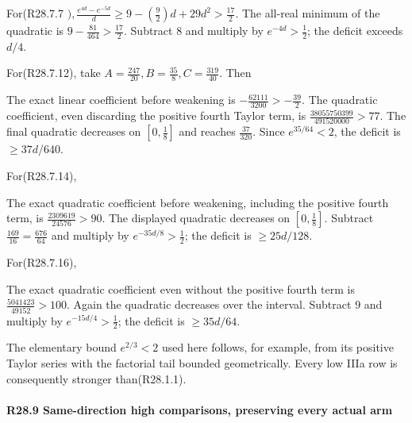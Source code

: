 For(R28.7.7 \(),\allowbreak \allowbreak \frac{e^{4d}-e^{-5d}}{d}\ge 9-(\frac{9}{2})d+29d^2>\frac{17}{2}\). The all-real minimum of the quadratic is \(9-\frac{81}{464}>\frac{17}{2}\). Subtract 8 and multiply by \(e^{-4d}>\frac{1}{2}\); the deficit exceeds \(d/4\).

For(R28.7.12), take \(A=\frac{247}{20},\allowbreak \allowbreak  B=\frac{35}{8},\allowbreak \allowbreak  C=\frac{319}{40}\). Then


The exact linear coefficient before weakening is \(-\frac{62111}{3200}>-\frac{39}{2}\). The quadratic coefficient, even discarding the positive fourth Taylor term, is \(\frac{38055750399}{491520000}>77\). The final quadratic decreases on \([0,\allowbreak \allowbreak \frac{1}{8}]\) and reaches \(\frac{37}{320}\). Since \(e^{35/64}<2\), the deficit is \(\ge 37d/640\).

For(R28.7.14),


The exact quadratic coefficient before weakening, including the positive fourth term, is \(\frac{2309619}{24576}>90\). The displayed quadratic decreases on \([0,\allowbreak \allowbreak \frac{1}{8}]\). Subtract \(\frac{169}{16}=\frac{676}{64}\) and multiply by \(e^{-35d/8}>\frac{1}{2}\); the deficit is \(\ge 25d/128\).

For(R28.7.16),


The exact quadratic coefficient even without the positive fourth term is \(\frac{5041423}{49152}>100\). Again the quadratic decreases over the interval. Subtract 9 and multiply by \(e^{-15d/4}>\frac{1}{2}\); the deficit is \(\ge 35d/64\).

The elementary bound \(e^{2/3}<2\) used here follows, for example, from its positive Taylor series with the factorial tail bounded geometrically. Every low IIIa row is consequently stronger than(R28.1.1).

\paragraph{R28.9 Same-direction high comparisons, preserving every actual arm}


